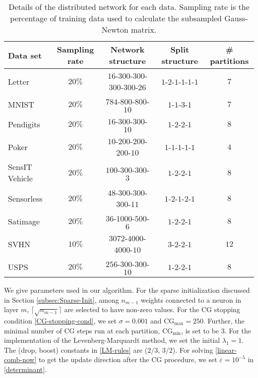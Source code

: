\documentclass[12pt]{article}
\renewcommand{\baselinestretch}{2}
\begin{document}
\begin{table}[t]
\begin{center}%
\caption{Details of the distributed network for each data. Sampling rate is the percentage of training data used to calculate the subsampled Gauss-Newton matrix.}%
\label{table:exp1-data-setting}
\begin{tabular}{l c c c c}%
Data set & Sampling rate & Network structure & Split structure & \# partitions\\
\hline
{\sf Letter} & $20\%$ & $16$-$300$-$300$-$300$-$300$-$26$ & $1$-$2$-$1$-$1$-$1$-$1$ & $7$\\
\hline
{\sf MNIST} & $20\%$ & $784$-$800$-$800$-$10$ & $1$-$1$-$3$-$1$ & $7$\\
\hline
{\sf Pendigits} & $20\%$ & $16$-$300$-$300$-$10$ & $1$-$2$-$2$-$1$ & $8$\\
\hline
{\sf Poker} & $20\%$ & $10$-$200$-$200$-$200$-$10$ & $1$-$1$-$1$-$1$-$1$ & $4$\\
\hline
{\sf SensIT Vehicle} & $20\%$ & $100$-$300$-$300$-$3$ & $1$-$2$-$2$-$1$ & $8$\\
\hline
{\sf Sensorless} & $20\%$ & $48$-$300$-$300$-$300$-$11$ & $1$-$2$-$1$-$2$-$1$ & $8$\\
\hline
{\sf Satimage} & $20\%$ & $36$-$1000$-$500$-$6$ & $1$-$2$-$2$-$1$ & $8$\\
\hline
{\sf SVHN} & $10\%$ & $3072$-$4000$-$4000$-$10$ & $3$-$2$-$2$-$1$ & $12$\\
\hline
{\sf USPS} & $20\%$ & $256$-$300$-$300$-$10$ & $1$-$2$-$2$-$1$ & $8$
\end{tabular}
\end{center}
\end{table}

\par We give parameters used in our algorithm. For the sparse initialization discussed in Section \ref{subsec:Sparse-Init}, among $n_{m-1}$ weights connected to a neuron in layer $m$, $\lceil \sqrt{n_{m-1}} \rceil$ are selected to have non-zero values. For the CG stopping condition \eqref{CG-stopping-cond}, we set $\sigma = 0.001$ and CG$_{\max} = 250$. Further, the minimal number of CG steps run at each partition, CG$_{\min}$, is set to be $3$. For the implementation of the Levenberg-Marquardt method, we set the initial $\lambda_1 = 1$. The (drop, boost) constants in \eqref{LM-rules} are ($2/3$, $3/2$).
For solving \eqref{linear-comb-now} to get the update direction after the CG procedure, we set $\varepsilon = 10^{-5}$ in \eqref{determinant}.
\end{document}

